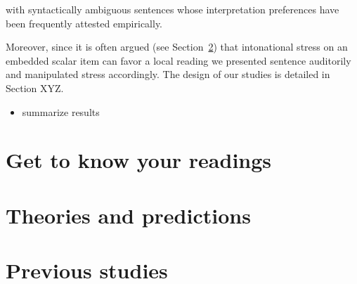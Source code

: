 \documentclass[fleqn,reqno,10pt]{article}
\begin{document}
 with syntactically ambiguous
sentences whose interpretation preferences have been frequently
attested empirically.



 Moreover,
since it is often argued (see Section~\ref{sec:theories-predictions})
that intonational stress on an embedded scalar item can favor a local
reading we presented sentence auditorily and manipulated stress
accordingly. The design of our studies is detailed in Section XYZ.

\begin{itemize}
\item summarize results
\end{itemize}





\bigskip





\section{Get to know your readings}
\label{sec:get-know-your}

\section{Theories and predictions}
\label{sec:theories-predictions}

\section{Previous studies}
\label{sec:previous-studies}





\printbibliography[heading=bibintoc]
\end{document}
